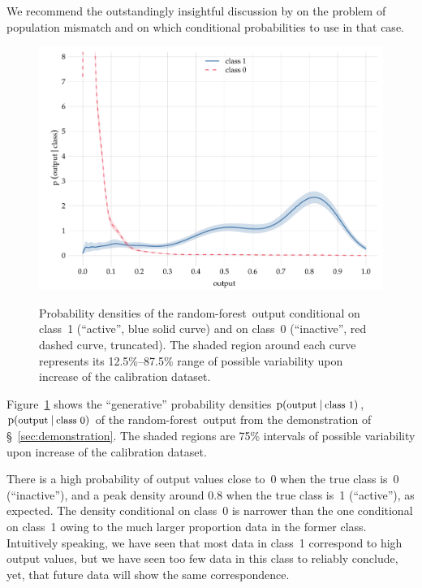 \documentclass[\ifafour a4paper,12pt,\else a5paper,10pt,\fi%
onecolumn,oneside,article,%
british%
]{memoir}
\theoremstyle{remark}
\theoremstyle{innote}
\newcommand*{\p}{\mathrm{p}}%
\renewcommand*{\|}[1][]{\nonscript\:#1\vert\nonscript\:\mathopen{}}
\newcommand*{\sect}{\S}%
\newcommand*{\texts}[1]{\text{\small #1}}
\newcommand*{\RF}{random forest}
\newcommand*{\rf}{random-forest}
\begin{document}
We recommend the outstandingly insightful discussion by \cites{lindleyetal1981} on the problem of population mismatch and on which conditional probabilities to use in that case.

\medskip

\begin{figure}[t]
  \centering
  \includegraphics[width=\linewidth]{transducer_curve_RFraw2_inverse_trunc.pdf}\\
  \caption{Probability densities of the \rf\ output conditional on class~1 (\enquote{active}, \textcolor{mypurpleblue}{blue solid curve}) and on class~0 (\enquote{inactive}, \textcolor{myred}{red dashed curve}, truncated). The shaded region around each curve represents its 12.5\%--87.5\% range of possible variability upon increase of the calibration dataset.}
  \label{fig:prob_curve_RF_inverse}
\end{figure}
%
Figure~\ref{fig:prob_curve_RF_inverse} shows the \enquote{generative} probability densities $\p(\texts{output} \| \texts{class 1})$, $\p(\texts{output} \| \texts{class 0})$ of the \rf\ output from the demonstration of \sect~\ref{sec:demonstration}. %
The shaded regions are 75\% intervals of possible variability upon increase of the calibration dataset.

There is a high probability of output values close to~0 when the true class is~0 (\enquote{inactive}), and a peak density around 0.8 when the true class is~1 (\enquote{active}), as expected. The density conditional on class~0 is narrower than the one conditional on class~1 owing to the much larger proportion data in the former class. Intuitively speaking, we have seen that most data in class~1 correspond to high output values, but we have seen too few data in this class to reliably conclude, yet, that future data will show the same correspondence. %
\end{document}
